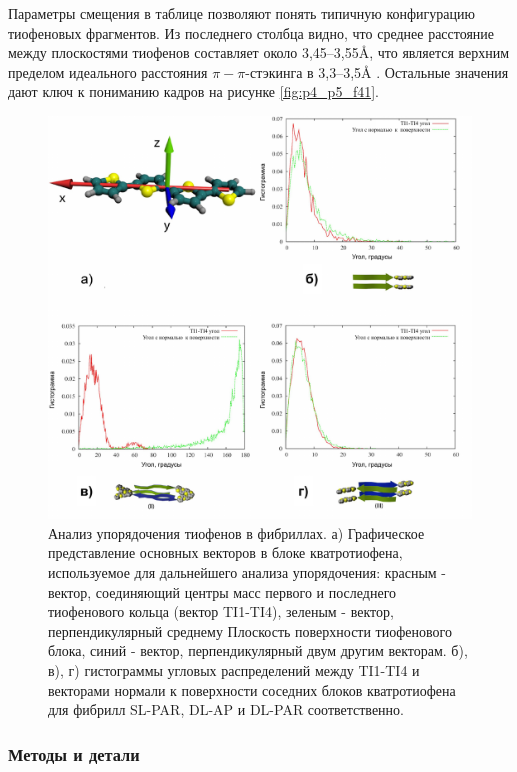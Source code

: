     Параметры смещения в таблице позволяют понять типичную конфигурацию тиофеновых фрагментов. Из последнего столбца видно, что среднее расстояние между плоскостями тиофенов составляет около 3,45–3,55\AA{}, что является верхним пределом идеального расстояния $\pi - \pi$-стэкинга  в 3,3–3,5\AA{} \cite{rodriguez-ropero_ab_2008,tsuzuki_model_2002}. Остальные значения дают ключ к пониманию кадров на рисунке \ref{fig:p4_p5_f41}.

\begin{figure} [H]
    \centering
    \includegraphics[width=\textwidth]{images/p4/punkt5/part4_p5_f42.pdf}
    \caption[Анализ упорядочения тиофенов в фибриллах]{Анализ упорядочения тиофенов в фибриллах. а) Графическое представление основных векторов в блоке кватротиофена, используемое для дальнейшего анализа упорядочения: красным - вектор, соединяющий центры масс первого и последнего тиофенового кольца (вектор TI1-TI4), зеленым - вектор, перпендикулярный среднему Плоскость поверхности тиофенового блока, синий - вектор, перпендикулярный двум другим векторам. б), в), г) гистограммы угловых распределений между TI1-TI4 и векторами нормали к поверхности соседних блоков кватротиофена для фибрилл SL-PAR, DL-AP и DL-PAR соответственно.}
    \label{fig:p4_p5_f42}
\end{figure}


\subsubsection{Методы и детали}

